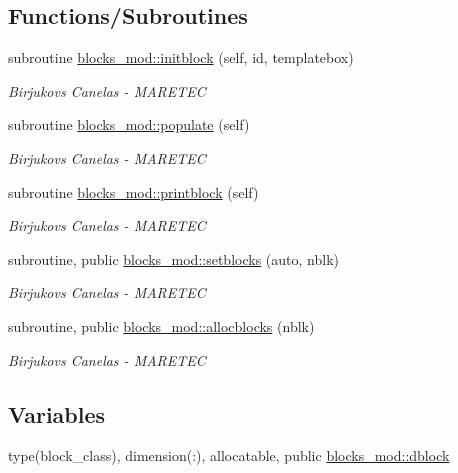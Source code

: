 \subsection*{Functions/\+Subroutines}
\begin{DoxyCompactItemize}
\item 
subroutine \hyperlink{namespaceblocks__mod_a534ca69b17b6f54ee07f995b02feff39}{blocks\+\_\+mod\+::initblock} (self, id, templatebox)
\begin{DoxyCompactList}\small\item\em Birjukovs Canelas -\/ M\+A\+R\+E\+T\+EC \end{DoxyCompactList}\item 
subroutine \hyperlink{namespaceblocks__mod_a7585844eb1b43604c04cb7a24c56205e}{blocks\+\_\+mod\+::populate} (self)
\begin{DoxyCompactList}\small\item\em Birjukovs Canelas -\/ M\+A\+R\+E\+T\+EC \end{DoxyCompactList}\item 
subroutine \hyperlink{namespaceblocks__mod_a6eab8b323cb15dcecb5c6b0c31b4e246}{blocks\+\_\+mod\+::printblock} (self)
\begin{DoxyCompactList}\small\item\em Birjukovs Canelas -\/ M\+A\+R\+E\+T\+EC \end{DoxyCompactList}\item 
subroutine, public \hyperlink{namespaceblocks__mod_a3312d23e0268d67aaf99d579aa57d0e7}{blocks\+\_\+mod\+::setblocks} (auto, nblk)
\begin{DoxyCompactList}\small\item\em Birjukovs Canelas -\/ M\+A\+R\+E\+T\+EC \end{DoxyCompactList}\item 
subroutine, public \hyperlink{namespaceblocks__mod_a639beb0fee2290d46353f4b4702d6711}{blocks\+\_\+mod\+::allocblocks} (nblk)
\begin{DoxyCompactList}\small\item\em Birjukovs Canelas -\/ M\+A\+R\+E\+T\+EC \end{DoxyCompactList}\end{DoxyCompactItemize}
\subsection*{Variables}
\begin{DoxyCompactItemize}
\item 
type(block\+\_\+class), dimension(\+:), allocatable, public \hyperlink{namespaceblocks__mod_ac8ad6e3cf7a812f95dadb592336aca50}{blocks\+\_\+mod\+::dblock}
\end{DoxyCompactItemize}
